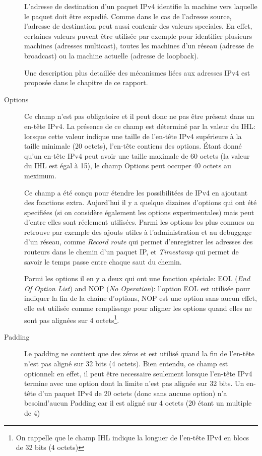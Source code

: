 \begin{description}
L'adresse de destination d'un paquet IPv4 identifie la machine vers
laquelle le paquet doit être expedié. Comme dans le cas de l'adresse source,
 l'adresse de destination peut aussi contenir des valeurs speciales. En effet, certaines 
valeurs puvent être utilisée par exemple pour identifier plusieurs machines
(adresses multicast), toutes les machines d'un réseau (adresse de broadcast) ou
la machine actuelle (adresse de loopback).

Une description plus detaillée des mécanismes liées aux adresses IPv4 est
proposée dans le chapitre  
de ce rapport.


\item [Options] 
Ce champ n'est pas obligatoire et il peut donc ne pas être présent dans un
en-tête IPv4. La présence de ce champ est déterminé par la valeur du
IHL: lorsque cette valeur indique une taille de l'en-tête IPv4 supérieure à 
la taille minimale (20 octets), l'en-tête contiens des options.
Étant donné qu'un en-tête IPv4 peut avoir une taille maximale de 
60 octets (la valeur du IHL est égal à 15), le champ Options peut occuper
40 octets au meximum.

Ce champ a été conçu pour étendre les possibilitées de IPv4 en ajoutant des fonctions
extra.  Aujord'hui il y a quelque dizaines d'options qui ont été
specifiées\cite{url-optsIPv4} (si on considère également les options experimentales)
mais peut d'entre elles sont réelement utilisées. Parmi les options les plus connues
on retrouve par exemple des ajouts utiles à l'administration et au debuggage
d'un réseau, comme {\it Record route} qui permet d'enregistrer les adresses
des routeurs dans le chemin d'un paquet IP, et {\it Timestamp} qui permet de
savoir le temps passe entre chaque saut du chemin.

Parmi les options il en y a deux qui ont une fonction spéciale: EOL 
({\it End Of Option List}) and NOP ({\it No Operation}): l'option EOL 
est utilisée pour indiquer la fin de la chaîne d'options, NOP est une option
sans aucun effet, elle est utilisée comme remplissage pour aligner les options 
quand elles ne sont pas alignées sur 4 octets\footnote {On rappelle que 
le champ IHL indique la longuer de l'en-tête IPv4 en blocs de 32 bits 
(4 octets)}.



\item [Padding] 
Le padding ne contient que des zéros et est utilisé quand la fin de l'en-tête
n'est pas aligné sur 32 bits (4 octets). Bien entendu, ce champ est optionnel:
en effet, il peut être necessaire seulement lorsque l'en-tête IPv4 termine avec
une option dont la limite n'est pas alignée sur 32 bits. Un en-tête d'un paquet IPv4 
de 20 octets (donc sans aucune option) n'a besoind'aucun Padding car il est aligné sur
4 octets (20 étant un multiple de 4)
\end{description}
